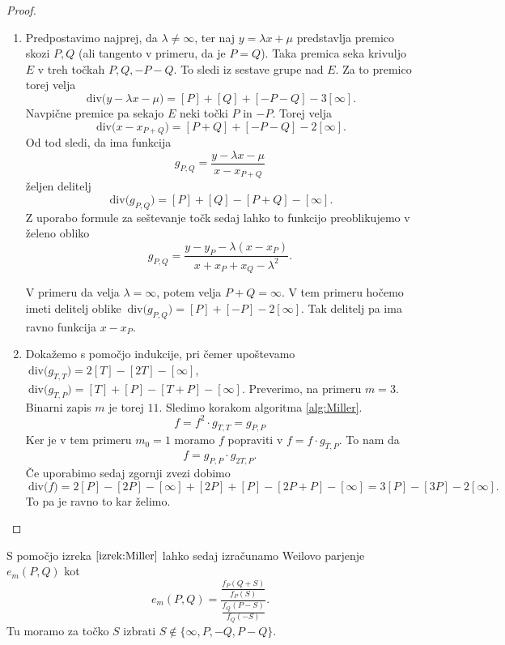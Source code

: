 \documentclass[12pt,a4paper,twoside]{article}
\theoremstyle{definition} %
\theoremstyle{plain} %
\numberwithin{equation}{section}  %
\newcommand{\Div}[1]{\ \text{div(}{#1}\text{)}}
\begin{document}
\begin{proof}

\begin{enumerate}
\item Predpostavimo najprej, da $\lambda \neq \infty$, ter naj $y = \lambda x + \mu$ predstavlja premico skozi $P,Q$ (ali tangento v primeru, da je $P=Q$). Taka premica seka krivuljo $E$ v treh točkah $P,Q,-P-Q$. To sledi iz sestave grupe nad $E$. Za to premico torej velja
$$\Div{y-\lambda x - \mu} = [P] + [Q] + [-P-Q] - 3[\infty].$$
Navpične premice pa sekajo $E$ neki točki $P$ in $-P$. Torej velja
$$\Div{x-x_{P+Q}} = [P+Q] + [-P-Q] - 2[\infty].$$
Od tod sledi, da ima funkcija
$$g_{P,Q} =\frac{y-\lambda x - \mu}{x-x_{P+Q}}$$
željen delitelj
$$\Div{g_{P,Q}} = [P] + [Q] - [P+Q] - [\infty].$$
Z uporabo formule za seštevanje točk sedaj lahko to funkcijo preoblikujemo v želeno obliko
$$g_{P,Q} = \frac{y-y_P-\lambda(x-x_P)}{x+x_P+x_Q-\lambda^2} .$$

V primeru da velja $\lambda = \infty$, potem velja $P+Q = \infty$. V tem primeru hočemo imeti delitelj oblike $\Div{g_{P,Q}} = [P] + [-P] - 2[\infty]$. Tak delitelj pa ima ravno funkcija $x-x_P$.

\item Dokažemo s pomočjo indukcije, pri čemer upoštevamo $\Div{g_{T,T}} = 2[T]-[2T]-[\infty]$, $\Div{g_{T,P}} = [T]+[P]-[T+P]-[\infty]$.
Preverimo, na primeru $m = 3$. Binarni zapis $m$ je torej $11$. Sledimo korakom algoritma \ref{alg:Miller}.
$$f = f^2 \cdot g_{T,T} = g_{P,P}$$
Ker je v tem primeru $m_0 = 1$ moramo $f$ popraviti v $f = f \cdot g_{T,P}$. To nam da
$$f = g_{P,P} \cdot g_{2T,P}.$$
Če uporabimo sedaj zgornji zvezi dobimo
$$\Div{f} = 2[P] - [2P] - [\infty] + [2P] + [P] - [2P+P] - [\infty] = 3[P] - [3P]-2[\infty].$$
To pa je ravno to kar želimo.

\end{enumerate}

\end{proof}

S pomočjo izreka $\ref{izrek:Miller}$ lahko sedaj izračunamo Weilovo parjenje $e_m(P,Q)$ kot
$$e_m(P,Q) = \frac{\frac{f_P(Q+S)}{f_P(S)}}{\frac{f_Q(P-S)}{f_Q(-S)}} .$$
Tu moramo za točko $S$ izbrati $S \notin \{ \infty,P,-Q,P-Q\}$.
\end{document}
